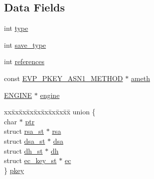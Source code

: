 \subsection*{Data Fields}
\begin{DoxyCompactItemize}
\item 
int \hyperlink{structevp__pkey__st_ac765329451135abec74c45e1897abf26}{type}
\item 
int \hyperlink{structevp__pkey__st_af2f92146d319f43c041db32f51d8cfa3}{save\+\_\+type}
\item 
int \hyperlink{structevp__pkey__st_a146fdb34d9a909e530adf8b189481195}{references}
\item 
const \hyperlink{crypto_2ossl__typ_8h_ad6f9ae1a91c11cdab63573650a801802}{E\+V\+P\+\_\+\+P\+K\+E\+Y\+\_\+\+A\+S\+N1\+\_\+\+M\+E\+T\+H\+OD} $\ast$ \hyperlink{structevp__pkey__st_a7fe088e482353854cce1b5769417f1ce}{ameth}
\item 
\hyperlink{crypto_2ossl__typ_8h_abac45b251498719318e60ab8d6192510}{E\+N\+G\+I\+NE} $\ast$ \hyperlink{structevp__pkey__st_ae4bca26806adfdaf8a28463c98ddf03a}{engine}
\item 
\begin{tabbing}
xx\=xx\=xx\=xx\=xx\=xx\=xx\=xx\=xx\=\kill
union \{\\
\>char $\ast$ \hyperlink{structevp__pkey__st_a935adc2e417a61d7eb6f04efb18ba031}{ptr}\\
\>struct \hyperlink{structrsa__st}{rsa\_st} $\ast$ \hyperlink{structevp__pkey__st_a7c43c4831c51c5171f307a37e3048fe7}{rsa}\\
\>struct \hyperlink{structdsa__st}{dsa\_st} $\ast$ \hyperlink{structevp__pkey__st_a1ecc1d7c58a2e0bdb7cf590b6bf460ef}{dsa}\\
\>struct \hyperlink{structdh__st}{dh\_st} $\ast$ \hyperlink{structevp__pkey__st_a785b287a6b8b973cc08c826970c74a63}{dh}\\
\>struct \hyperlink{structec__key__st}{ec\_key\_st} $\ast$ \hyperlink{structevp__pkey__st_a895fc1ecb495078b3d24c1f4faacf4e6}{ec}\\
\} \hyperlink{structevp__pkey__st_a1d65464162b5e92efb7bce964af255f5}{pkey}\\


\end{tabbing}
\end{DoxyCompactItemize}
